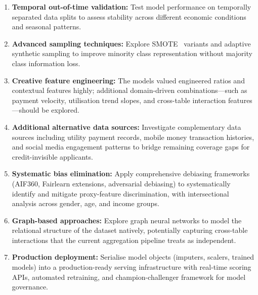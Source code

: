 \begin{enumerate}
    \item \textbf{Temporal out-of-time validation:} Test model performance on temporally separated data splits to assess stability across different economic conditions and seasonal patterns.
    \item \textbf{Advanced sampling techniques:} Explore SMOTE~\cite{chawla2002} variants and adaptive synthetic sampling to improve minority class representation without majority class information loss.
    \item \textbf{Creative feature engineering:} The models valued engineered ratios and contextual features highly; additional domain-driven combinations---such as payment velocity, utilisation trend slopes, and cross-table interaction features---should be explored.
    \item \textbf{Additional alternative data sources:} Investigate complementary data sources including utility payment records, mobile money transaction histories, and social media engagement patterns to bridge remaining coverage gaps for credit-invisible applicants.
    \item \textbf{Systematic bias elimination:} Apply comprehensive debiasing frameworks (AIF360, Fairlearn extensions, adversarial debiasing) to systematically identify and mitigate proxy-feature discrimination, with intersectional analysis across gender, age, and income groups.
    \item \textbf{Graph-based approaches:} Explore graph neural networks to model the relational structure of the dataset natively, potentially capturing cross-table interactions that the current aggregation pipeline treats as independent.
    \item \textbf{Production deployment:} Serialise model objects (imputers, scalers, trained models) into a production-ready serving infrastructure with real-time scoring APIs, automated retraining, and champion-challenger framework for model governance.
\end{enumerate}
